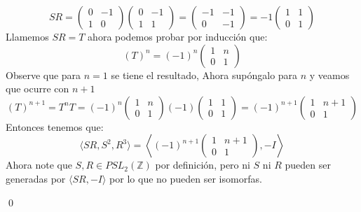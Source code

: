 \begin{homeworkProblem}
\begin{solucion}
        $$SR=\begin{pmatrix}
          0 & -1\\
          1 & 0
        \end{pmatrix}\begin{pmatrix}
            0 & -1\\
            1 & 1
        \end{pmatrix}=\begin{pmatrix}
            -1 & -1\\
            0& -1
        \end{pmatrix}=-1\begin{pmatrix}
            1 & 1\\
            0& 1
        \end{pmatrix}$$
        Llamemos $SR=T$ ahora podemos probar por inducción que:
        $$(T)^n=(-1)^n\begin{pmatrix}
            1 & n\\
            0& 1
        \end{pmatrix}$$
        Observe que para $n=1$ se tiene el resultado, Ahora supóngalo para $n$ y veamos que ocurre con $n+1$
        $$(T)^{n+1}=T^nT=(-1)^n\begin{pmatrix}
            1 & n\\
            0& 1
        \end{pmatrix}(-1)\begin{pmatrix}
            1 & 1\\
            0& 1
        \end{pmatrix}=(-1)^{n+1}\begin{pmatrix}
            1 & n+1\\
            0& 1
        \end{pmatrix}$$
        Entonces tenemos que:
        $$\langle SR,S^2,R^3\rangle=\left\langle(-1)^{n+1}\begin{pmatrix}
            1 & n+1\\
            0& 1
        \end{pmatrix},-I\right\rangle$$
        Ahora note que $S,R\in PSL_2(\mathbb{Z})$ por definición, pero ni $S$ ni $R$ pueden ser generadas por $\langle SR,-I\rangle$ por lo que no pueden ser isomorfas.
        
        \qed
        \end{solucion}
        
\end{homeworkProblem}

